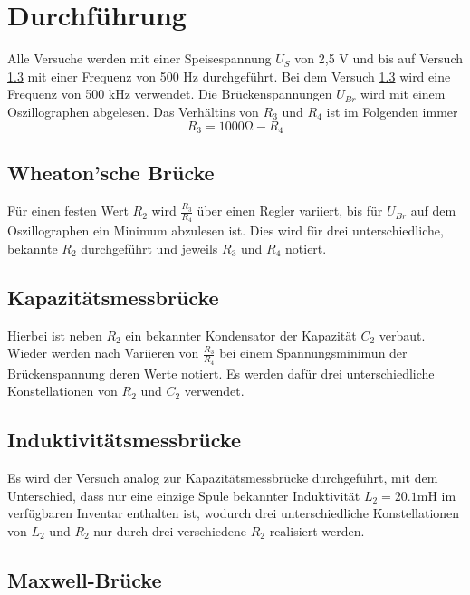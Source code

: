 \section{Durchführung}
\label{sec:Durchführung}

Alle Versuche werden mit einer Speisespannung $U_S$ von 2,5 \si{\volt} und bis auf Versuch \ref{sec:Induktivitätsmessbrücke} mit einer Frequenz von 500 \si{\hertz}
durchgeführt. Bei dem Versuch \ref{sec:Induktivitätsmessbrücke} wird eine Frequenz von 500 \si{\kilo\hertz} verwendet. Die Brückenspannungen $U_{Br}$ wird mit einem Oszillographen abgelesen. Das Verhältins von 
$R_3$ und $R_4$ ist im Folgenden immer \begin{equation}
    R_3 = 1000\si{\ohm} - R_4
\end{equation}

\subsection{Wheaton'sche Brücke}

Für einen festen Wert $R_2$ wird $\frac{R_3}{R_4}$ über einen Regler variiert, bis für $U_{Br}$ auf dem 
Oszillographen ein Minimum abzulesen ist. Dies wird für drei unterschiedliche, bekannte $R_2$ 
durchgeführt und jeweils $R_3$ und $R_4$ notiert. 

\subsection{Kapazitätsmessbrücke}

Hierbei ist neben $R_2$ ein bekannter Kondensator der Kapazität $C_2$ verbaut. 
Wieder werden nach Variieren von $\frac{R_3}{R_4}$ bei einem Spannungsminimun der
Brückenspannung deren Werte notiert. Es werden dafür drei unterschiedliche Konstellationen
von $R_2$ und $C_2$ verwendet. 

\subsection{Induktivitätsmessbrücke}
\label{sec:Induktivitätsmessbrücke}
Es wird der Versuch analog zur Kapazitätsmessbrücke durchgeführt, mit dem Unterschied, 
dass nur eine einzige Spule bekannter Induktivität $L_2=20.1\si{\milli\henry}$ im verfügbaren Inventar enthalten ist,
wodurch drei unterschiedliche Konstellationen von $L_2$ und $R_2$ nur durch drei verschiedene 
$R_2$ realisiert werden.

\subsection{Maxwell-Brücke}

